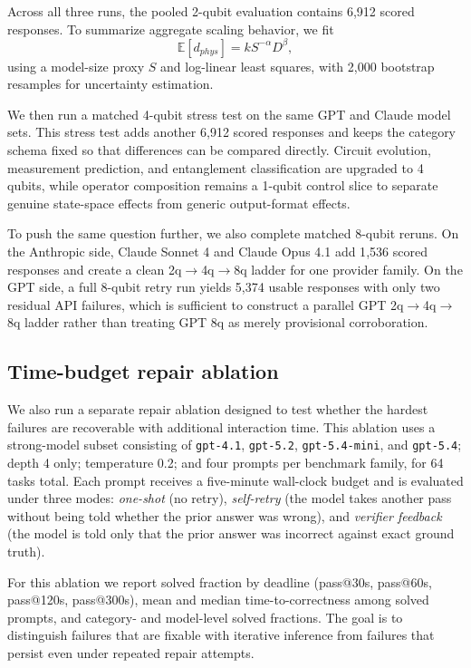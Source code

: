 \documentclass[11pt]{article}
\begin{document}
Across all three runs, the pooled 2-qubit evaluation contains 6{,}912 scored responses. To summarize aggregate scaling behavior, we fit
\[
\mathbb{E}[d_{phys}] = k S^{-\alpha} D^{\beta},
\]
using a model-size proxy $S$ and log-linear least squares, with 2{,}000 bootstrap resamples for uncertainty estimation.

We then run a matched 4-qubit stress test on the same GPT and Claude model sets. This stress test adds another 6{,}912 scored responses and keeps the category schema fixed so that differences can be compared directly. Circuit evolution, measurement prediction, and entanglement classification are upgraded to 4 qubits, while operator composition remains a 1-qubit control slice to separate genuine state-space effects from generic output-format effects.

To push the same question further, we also complete matched 8-qubit reruns. On the Anthropic side, Claude Sonnet 4 and Claude Opus 4.1 add 1{,}536 scored responses and create a clean 2q$\rightarrow$4q$\rightarrow$8q ladder for one provider family. On the GPT side, a full 8-qubit retry run yields 5{,}374 usable responses with only two residual API failures, which is sufficient to construct a parallel GPT 2q$\rightarrow$4q$\rightarrow$8q ladder rather than treating GPT 8q as merely provisional corroboration.

\subsection{Time-budget repair ablation}
We also run a separate repair ablation designed to test whether the hardest failures are recoverable with additional interaction time. This ablation uses a strong-model subset consisting of \texttt{gpt-4.1}, \texttt{gpt-5.2}, \texttt{gpt-5.4-mini}, and \texttt{gpt-5.4}; depth 4 only; temperature 0.2; and four prompts per benchmark family, for 64 tasks total. Each prompt receives a five-minute wall-clock budget and is evaluated under three modes: \emph{one-shot} (no retry), \emph{self-retry} (the model takes another pass without being told whether the prior answer was wrong), and \emph{verifier feedback} (the model is told only that the prior answer was incorrect against exact ground truth).

For this ablation we report solved fraction by deadline (pass@30s, pass@60s, pass@120s, pass@300s), mean and median time-to-correctness among solved prompts, and category- and model-level solved fractions. The goal is to distinguish failures that are fixable with iterative inference from failures that persist even under repeated repair attempts.
\end{document}
